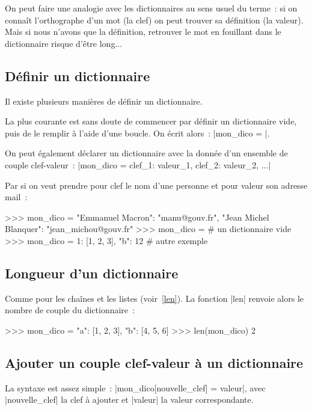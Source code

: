 		On peut faire une analogie avec les dictionnaires au sens usuel du terme~: si on connaît l'orthographe d'un mot (la clef) on peut trouver sa définition (la valeur).
		Mais si nous n'avons que la définition, retrouver le mot en fouillant dans le dictionnaire risque d'être long$\ldots$
		
	\subsection{Définir un dictionnaire}
		
		Il existe plusieurs manières de définir un dictionnaire.
		
		La plus courante est sans doute de commencer par définir un dictionnaire vide, puis de le remplir à l'aide d'une boucle. On écrit alors~: \python|mon_dico = {}|.
		
		On peut également déclarer un dictionnaire avec la donnée d'un ensemble de couple clef-valeur~: \python|mon_dico = {clef_1: valeur_1, clef_2: valeur_2, ...}|
		
		Par si on veut prendre pour clef le nom d'une personne et pour valeur son adresse mail~:
		\begin{pythoncode}
			>>> mon_dico = {"Emmanuel Macron": "manu@gouv.fr", "Jean Michel Blanquer": "jean_michou@gouv.fr"}
			>>> mon_dico = {} # un dictionnaire vide
			>>> mon_dico = {1: [1, 2, 3], "b": 12} # autre exemple
		\end{pythoncode}
	
	\subsection{Longueur d'un dictionnaire}
		
		Comme pour les chaînes et les listes (voir~\ref{len}). La fonction \python|len| renvoie alors le nombre de couple du dictionnaire~:
		
		\begin{pythoncode}
			>>> mon_dico = {"a": [1, 2, 3], "b": [4, 5, 6]}
			>>> len(mon_dico)
			2
		\end{pythoncode}
	
	\subsection{Ajouter un couple clef-valeur à un dictionnaire}
		
		La syntaxe est assez simple~: \python|mon_dico[nouvelle_clef] = valeur|, avec \python|nouvelle_clef| la clef à ajouter et \python|valeur| la valeur correspondante.

